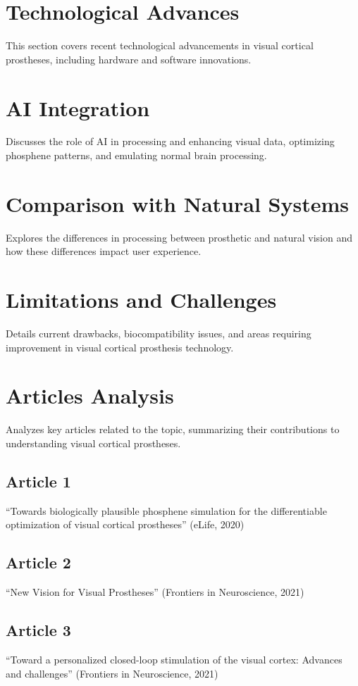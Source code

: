 \documentclass[twocolumn,10pt]{article}
\begin{document}
\section{Technological Advances}\label{sec:tech_advances}
This section covers recent technological advancements in visual cortical prostheses, including hardware and software innovations.

\section{AI Integration}\label{sec:ai_integration}
Discusses the role of AI in processing and enhancing visual data, optimizing phosphene patterns, and emulating normal brain processing.

\section{Comparison with Natural Systems}\label{sec:comparison}
Explores the differences in processing between prosthetic and natural vision and how these differences impact user experience.

\section{Limitations and Challenges}\label{sec:limitations}
Details current drawbacks, biocompatibility issues, and areas requiring improvement in visual cortical prosthesis technology.

\section{Articles Analysis}\label{sec:articles}
Analyzes key articles related to the topic, summarizing their contributions to understanding visual cortical prostheses.

\subsection{Article 1}
``Towards biologically plausible phosphene simulation for the differentiable optimization of visual cortical prostheses'' (eLife, 2020)

\subsection{Article 2}
``New Vision for Visual Prostheses'' (Frontiers in Neuroscience, 2021)

\subsection{Article 3}
``Toward a personalized closed-loop stimulation of the visual cortex: Advances and challenges'' (Frontiers in Neuroscience, 2021)
\end{document}

